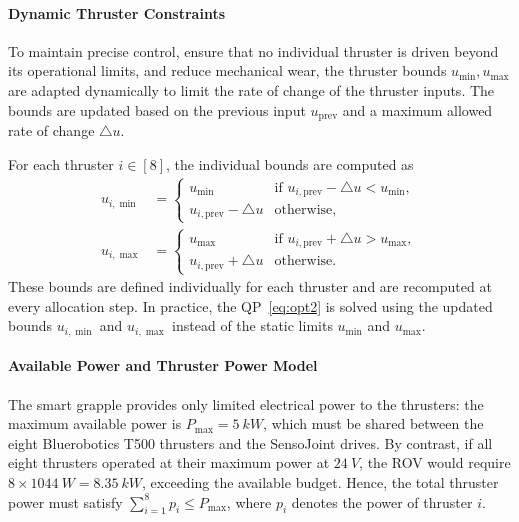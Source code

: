 \paragraph{Dynamic Thruster Constraints}
To maintain precise control, ensure that no individual thruster is driven beyond its operational limits, and reduce mechanical wear, the thruster bounds $u_{\min}, u_{\max}$ are adapted dynamically to limit the rate of change of the thruster inputs. 
The bounds are updated based on the previous input $u_{\mathrm{prev}}$ and a maximum allowed rate of change $\triangle u$.

For each thruster $i \in [8]$,   the individual bounds are computed as
\begin{equation}
\begin{aligned}
u_{i,\min} &=
\begin{cases}
    u_{\min} & \text{if } u_{i,\mathrm{prev}} - \triangle u < u_{\min},\\[2pt]
    u_{i,\mathrm{prev}} - \triangle u & \text{otherwise,}
\end{cases} \\
u_{i,\max} &=
\begin{cases}
    u_{\max} & \text{if } u_{i,\mathrm{prev}} + \triangle u > u_{\max},\\[2pt]
    u_{i,\mathrm{prev}} + \triangle u & \text{otherwise.}
\end{cases}
\end{aligned}
\label{eq:maximum_rate_of_change}
\end{equation}
These bounds are defined individually for each thruster and are recomputed at every allocation step. 
In practice, the QP~\eqref{eq:opt2} is solved using the updated bounds $u_{i,\min}$ and $u_{i,\max}$ instead of the static limits $u_{\min}$ and $u_{\max}$.


\paragraph{Available Power and Thruster Power Model}

The smart grapple provides only limited electrical power to the thrusters: the maximum available power is \(P_{\max} = \SI{5}{kW}\), which must be shared between the eight Bluerobotics T500 thrusters and the SensoJoint drives. By contrast, if all eight thrusters operated at their maximum power at \(\SI{24}{V}\), the ROV would require \(8 \times \SI{1044}{W} = \SI{8.35}{kW}\), exceeding the available budget. Hence, the total thruster power must satisfy \(\sum_{i=1}^8 p_i \leq P_{\max}\), where \(p_i\) denotes the power of thruster \(i\).

